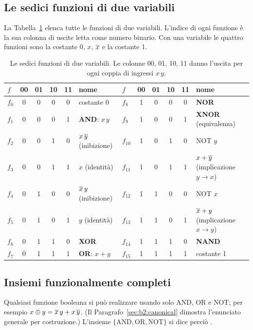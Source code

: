 \subsection{Le sedici funzioni di due variabili}

La Tabella~\ref{tab:b2:sixteen} elenca tutte le funzioni di due variabili.
L'indice di ogni funzione è la sua colonna di uscite letta come numero binario.
Con una variabile le quattro funzioni sono la costante 0, $x$, $\overline{x}$ e la
costante 1.

\begin{table}[htb]
\centering\small
\caption{Le sedici funzioni di due variabili. Le colonne 00, 01, 10, 11 danno
l'uscita per ogni coppia di ingressi $x\,y$.}\label{tab:b2:sixteen}
\begin{tabular}{@{}lccccl@{\qquad}lccccl@{}}
\toprule
$f$ & 00 & 01 & 10 & 11 & \textbf{nome} & $f$ & 00 & 01 & 10 & 11 & \textbf{nome}\\
\midrule
$f_0$ & 0&0&0&0 & costante 0 & $f_8$ & 1&0&0&0 & \textbf{NOR}\\
$f_1$ & 0&0&0&1 & \textbf{AND}: $x\,y$ & $f_9$ & 1&0&0&1 & \textbf{XNOR} (equivalenza)\\
$f_2$ & 0&0&1&0 & $x\,\overline{y}$ (inibizione) & $f_{10}$ & 1&0&1&0 & NOT $y$\\
$f_3$ & 0&0&1&1 & $x$ (identità) & $f_{11}$ & 1&0&1&1 & $x+\overline{y}$ (implicazione $y\to x$)\\
$f_4$ & 0&1&0&0 & $\overline{x}\,y$ (inibizione) & $f_{12}$ & 1&1&0&0 & NOT $x$\\
$f_5$ & 0&1&0&1 & $y$ (identità) & $f_{13}$ & 1&1&0&1 & $\overline{x}+y$ (implicazione $x\to y$)\\
$f_6$ & 0&1&1&0 & \textbf{XOR} & $f_{14}$ & 1&1&1&0 & \textbf{NAND}\\
$f_7$ & 0&1&1&1 & \textbf{OR}: $x+y$ & $f_{15}$ & 1&1&1&1 & costante 1\\
\bottomrule
\end{tabular}
\end{table}

\subsection{Insiemi funzionalmente completi}

Qualsiasi funzione booleana si può realizzare usando solo AND, OR e NOT; per
esempio $x\oplus y=\overline{x}\,y+x\,\overline{y}$. (Il
Paragrafo~\ref{sec:b2:canonical} dimostra l'enunciato generale per
costruzione.) L'insieme $\{\text{AND},\text{OR},\text{NOT}\}$ si dice perciò
.

